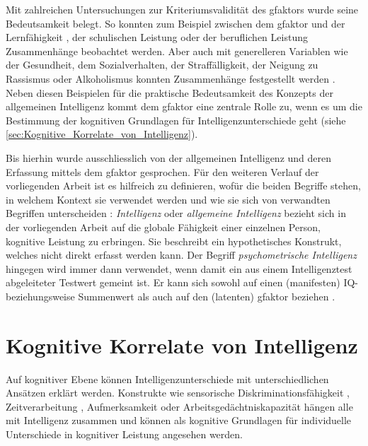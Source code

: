 \documentclass[11pt, twoside, a4paper]{book}		%
\begin{document}
Mit zahlreichen Untersuchungen zur Kriteriumsvalidität des \gls{gfaktor}s wurde seine Bedeutsamkeit belegt. So konnten zum Beispiel zwischen dem \gls{gfaktor} und der Lernfähigkeit \citep{Christal1991}, der schulischen Leistung \citep{Jensen1998a} oder der beruflichen Leistung \citep{Schmidt2004} Zusammenhänge beobachtet werden. Aber auch mit generelleren Variablen wie der Gesundheit, dem Sozialverhalten, der Straffälligkeit, der Neigung zu Rassismus oder Alkoholismus konnten Zusammenhänge festgestellt werden \citep[für eine Übersicht siehe][]{Brand1987}. 
Neben diesen Beispielen für die praktische Bedeutsamkeit des Konzepts der allgemeinen Intelligenz kommt dem \gls{gfaktor} eine zentrale Rolle zu, wenn es um die Bestimmung der kognitiven Grundlagen für Intelligenzunterschiede geht (siehe \autoref{sec:Kognitive_Korrelate_von_Intelligenz}).

Bis hierhin wurde ausschliesslich von der allgemeinen Intelligenz und deren Erfassung mittels dem \gls{gfaktor} gesprochen. Für den weiteren Verlauf der vorliegenden Arbeit ist es hilfreich zu definieren, wofür die beiden Begriffe stehen, in welchem Kontext sie verwendet werden und wie sie sich von verwandten Begriffen unterscheiden \citep[für eine ähnliche Begriffsverwendung siehe][]{Rabaglia2011}:
\textit{Intelligenz} oder \textit{allgemeine Intelligenz} bezieht sich in der vorliegenden Arbeit auf die globale Fähigkeit einer einzelnen Person, kognitive Leistung zu erbringen. Sie beschreibt ein hypothetisches Konstrukt, welches nicht direkt erfasst werden kann.
Der Begriff \textit{psychometrische Intelligenz} hingegen wird immer dann verwendet, wenn damit ein aus einem Intelligenztest abgeleiteter Testwert gemeint ist. Er kann sich sowohl auf einen (manifesten) IQ- beziehungsweise Summenwert als auch auf den (latenten) \gls{gfaktor} beziehen \citep[die beiden Werte sind stark korreliert, siehe][S. 90]{Jensen1998a}.

\section{Kognitive Korrelate von Intelligenz \label{sec:Kognitive_Korrelate_von_Intelligenz}}

Auf kognitiver Ebene können Intelligenzunterschiede mit unterschiedlichen Ansätzen erklärt werden. Konstrukte wie sensorische Diskriminationsfähigkeit \citep[z.~B.][]{Galton1883, Spearman1904, Deary2004, Meyer2010}, Zeitverarbeitung \citep[z.~B.][]{Rammsayer2002}, Aufmerksamkeit \citep[z.~B.][]{Schweizer2004} oder Arbeitsgedächtniskapazität \citep[für eine Metaanalyse siehe][]{Ackerman2005} hängen alle mit Intelligenz zusammen und können als kognitive Grundlagen für individuelle Unterschiede in kognitiver Leistung angesehen werden. 
\end{document}
